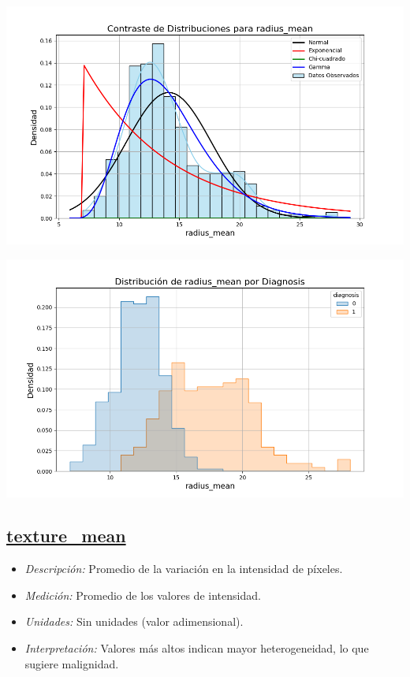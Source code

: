 \documentclass[a4paper, 12pt]{article}
\begin{document}
\includegraphics[width=\textwidth]{../Plots/plots_stats/radius_mean/distribuciones_conocidas_radius_mean.png}

\includegraphics[width=\textwidth]{../Plots/plots_diagnosis/distribucion_radius_mean_por_diagnosis.png}


\subsection*{\underline{texture\_mean}}


    \begin{itemize}
	\item \textit{Descripción:} Promedio de la variación en la intensidad de píxeles.
	\item \textit{Medición:} Promedio de los valores de intensidad.
	\item \textit{Unidades:} Sin unidades (valor adimensional).
	\item \textit{Interpretación:} Valores más altos indican mayor heterogeneidad, lo que sugiere malignidad.
\end{itemize}
\end{document}
